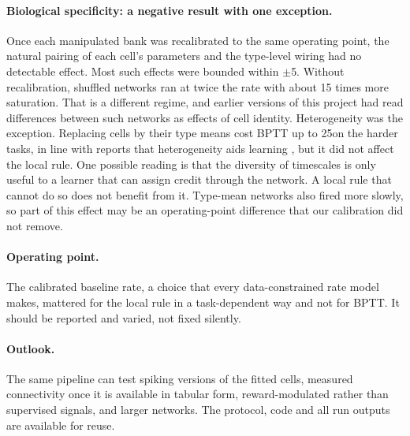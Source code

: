 \paragraph{Biological specificity: a negative result with one exception.}
Once each manipulated bank was recalibrated to the same operating point, the natural pairing of
each cell's parameters and the type-level wiring had no detectable effect. Most such effects
were bounded within $\pm$5\pp. Without recalibration, shuffled networks ran at twice the rate
with about 15 times more saturation. That is a different regime, and earlier versions of this
project had read differences between such networks as effects of cell identity. Heterogeneity
was the exception. Replacing cells by their type means cost BPTT up to 25\pp on the harder tasks,
in line with reports that heterogeneity aids learning \citep{pereznieves2021}, but it did not
affect the local rule. One possible reading is that the diversity of timescales is only useful
to a learner that can assign credit through the network. A local rule that cannot do so does not
benefit from it. Type-mean networks also fired more slowly, so part of this effect may be an
operating-point difference that our calibration did not remove.

\paragraph{Operating point.}
The calibrated baseline rate, a choice that every data-constrained rate model makes, mattered
for the local rule in a task-dependent way and not for BPTT. It should be reported and
varied, not fixed silently.



\paragraph{Outlook.}
The same pipeline can test spiking versions of the fitted cells, measured connectivity once it
is available in tabular form, reward-modulated rather than supervised signals, and larger
networks. The protocol, code and all run outputs are available for reuse.
